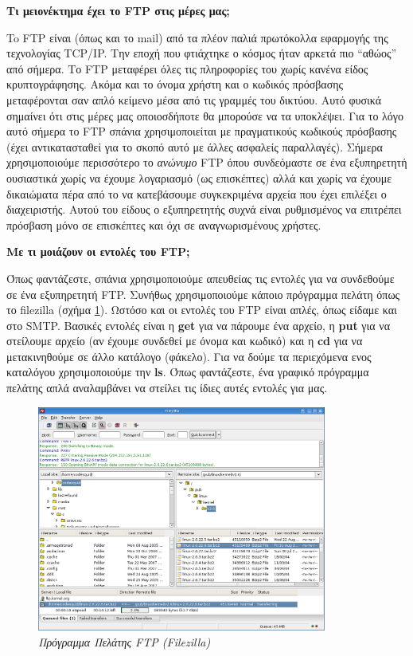 \begin{inthebox}
\textbf{Τι μειονέκτημα έχει το FTP στις μέρες μας;}

To FTP είναι (όπως και το mail) από τα πλέον παλιά πρωτόκολλα εφαρμογής της τεχνολογίας TCP/IP. Την εποχή που φτιάχτηκε ο κόσμος ήταν αρκετά πιο ``αθώος'' από σήμερα. Το FTP μεταφέρει όλες τις πληροφορίες του χωρίς κανένα είδος κρυπτογράφησης. Ακόμα και το όνομα χρήστη και ο κωδικός πρόσβασης μεταφέρονται σαν απλό κείμενο μέσα από τις γραμμές του δικτύου. Αυτό φυσικά σημαίνει ότι στις μέρες μας οποιοσδήποτε θα μπορούσε να τα υποκλέψει. Για το λόγο αυτό σήμερα το FTP σπάνια χρησιμοποιείται με πραγματικούς κωδικούς πρόσβασης (έχει αντικατασταθεί για το σκοπό αυτό με άλλες ασφαλείς παραλλαγές). Σήμερα χρησιμοποιούμε περισσότερο το \emph{ανώνυμο} FTP όπου συνδεόμαστε σε ένα εξυπηρετητή ουσιαστικά χωρίς να έχουμε λογαριασμό (ως επισκέπτες) αλλά και χωρίς να έχουμε δικαιώματα πέρα από το να κατεβάσουμε συγκεκριμένα αρχεία που έχει επιλέξει ο διαχειριστής. Αυτού του είδους ο εξυπηρετητής συχνά είναι ρυθμισμένος να επιτρέπει πρόσβαση μόνο σε επισκέπτες και όχι σε αναγνωρισμένους χρήστες. 

\textbf{Με τι μοιάζουν οι εντολές του FTP;}

Όπως φαντάζεστε, σπάνια χρησιμοποιούμε απευθείας τις εντολές για να συνδεθούμε σε ένα εξυπηρετητή FTP. Συνήθως χρησιμοποιούμε κάποιο πρόγραμμα πελάτη όπως το filezilla (σχήμα \ref{6-9}). Ωστόσο και οι εντολές του FTP είναι απλές, όπως είδαμε και στο SMTP. Βασικές εντολές είναι η \textbf{get} για να πάρουμε ένα αρχείο, η \textbf{put} για να στείλουμε αρχείο (αν έχουμε συνδεθεί με όνομα και κωδικό) και η \textbf{cd} για να μετακινηθούμε σε άλλο κατάλογο (φάκελο). Για να δούμε τα περιεχόμενα ενος καταλόγου χρησιμοποιούμε την \textbf{ls}. Όπως φαντάζεστε, ένα γραφικό πρόγραμμα πελάτης απλά αναλαμβάνει να στείλει τις ίδιες αυτές εντολές για μας.\\
\end{inthebox}

\begin{figure}[!ht]
 \centering
 \includegraphics[width=0.85\textwidth]{images/chapter6/6-9}
 \caption {\textsl{Πρόγραμμα Πελάτης FTP (Filezilla)}}
 \label{6-9}
\end{figure}

